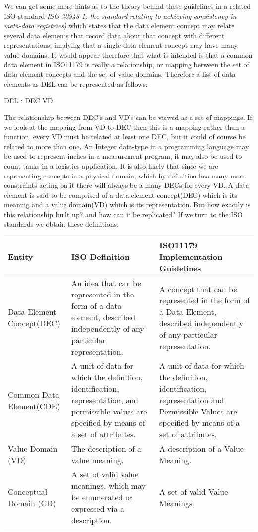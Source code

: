 We can get some more hints as to the theory behind these guidelines in a related ISO standard \emph{ISO 20943-1: the standard relating to achieving consistency in meta-data registries)} which states that the data element concept may relate several data elements that record data about that concept with different representations, implying that a single data element concept may have many value domains. It would appear therefore that what is intended is that a common data element in ISO11179 is really a relationship, or mapping between the set of data element concepts and the set of value domains. Therefore a list of data elements as DEL can be represented as follows:
\vskip 4mm
\begin{axdef}DEL : DEC \rel VD\end{axdef}
\vskip 4mm
The relationship between DEC's and VD's can be viewed as a set of mappings. If we look at the mapping from VD to DEC then this is a mapping rather than a function, every VD must be related at least one DEC, but it could of course be related to more than one.  An Integer data-type in a programming language may be used to represent inches in a measurement program, it may also be used to count tanks in a logistics application. It is also likely that since we are representing concepts in a physical domain, which by definition has many more constraints acting on it there will always be a many DECs for every VD.
A data element is said to be comprised of a data element concept(DEC) which is its meaning and a value domain(VD) which is its representation. But how exactly is this relationship built up? and how can it be replicated? 
If we turn to the ISO standards we obtain these definitions:
\vskip 4mm 

\begin{table}[h]
	\begin{tabular}{ p{1.8cm} p{2.8cm}  p{3.0cm}  }  %
		\hline
		Entity & ISO Definition & ISO11179 Implementation Guidelines  \\ 
		\hline
		Data Element Concept(DEC) & An idea that can be represented in the form of a data element, described independently of any particular representation. & A concept that can be represented in the form of a Data Element, described independently of any particular representation.\\
		Common Data Element(CDE) & A unit of data for which the definition, identification, representation, and permissible values are specified by means of a set of attributes. & A unit of data for which the definition, identification, representation and Permissible Values are specified by means of a set of attributes. \\
		Value Domain (VD) & The description of a value meaning. & A description of a Value Meaning. \\
		Conceptual Domain (CD) & A set of valid value meanings, which may be enumerated or expressed via a description.& A set of valid Value Meanings.\\
		\hline
	\end{tabular}
\end{table}

